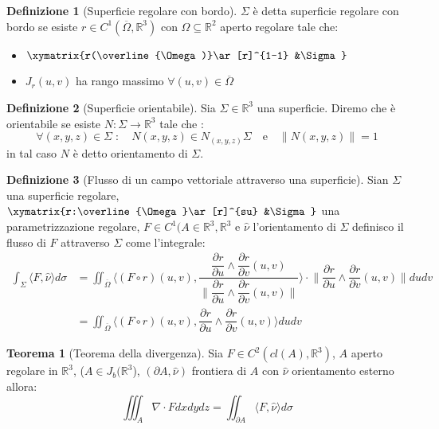 \documentclass[leqno]{article}
\theoremstyle{definition}
\newtheorem{definition}{Definizione}[section]
\numberwithin{equation}{section}
\newtheorem{theorem}{Teorema}[section]
\theoremstyle{remark}
\begin{document}
		\begin{definition}[Superficie regolare con bordo]
			$\Sigma$ è detta superficie regolare con bordo se esiste $r\in C^1(\overline{\Omega}, \mathbb{R}^3)$ con $\Omega \subseteq \mathbb{R}^2$ aperto regolare tale che:
			\begin{itemize}
				\item $\xymatrix{r(\overline{\Omega)}\ar[r]^{1-1} &\Sigma}$
				\item $J_r(u,v)$ ha rango massimo $\forall (u,v)\in \overline{\Omega}$
			\end{itemize}
		\end{definition}
		
		\begin{definition}[Superficie orientabile]
			Sia $\Sigma \in \mathbb{R}^3 $ una superficie. Diremo che è   orientabile se esiste $N:\Sigma \to \mathbb{R}^3$ tale che :
			\begin{equation}
				\forall(x,y,z)\in \Sigma \; : \quad N(x,y,z)\in N_{(x,y,z)}\Sigma \quad \text{e} \quad \lVert N(x,y,z) \rVert = 1
			\end{equation}
			in tal caso $N$ è detto orientamento di $\Sigma$.
		\end{definition}
		
		\begin{definition}[Flusso di un campo vettoriale attraverso una superficie]
			Sian $\Sigma$ una superficie regolare, $\xymatrix{r:\overline{\Omega}\ar[r]^{su} &\Sigma}$ una parametrizzazione regolare, $F\in C^1(A\in \mathbb{R}^3, \mathbb{R}^3$ e $\hat{\nu}$ l'orientamento di $\Sigma$ definisco il flusso di $F$ attraverso $\Sigma$ come l'integrale: 
			\begin{equation}
				\begin{aligned}
					\int_{\Sigma} \langle F, \hat{\nu}\rangle d \sigma &= \iint_{\overline{\Omega}}\langle \left(F \circ r\right) (u,v),\dfrac{ \dfrac{\partial r}{\partial u}\wedge \dfrac {\partial r}{\partial v} (u,v) }{\lVert \dfrac{\partial r}{\partial u}\wedge \dfrac{\partial r}{\partial v} (u,v) \rVert}\rangle \cdot  \lVert \dfrac{\partial r}{\partial u}\wedge \dfrac{\partial r}{\partial v} (u,v) \rVert dudv \\ &=\iint_{\overline{\Omega}}\langle \left(F \circ r\right) (u,v), \dfrac{\partial r}{\partial u}\wedge \dfrac {\partial r}{\partial v} (u,v) \rangle dudv
				\end{aligned}
			\end{equation}
			\end {definition}
			
			\begin{theorem}[Teorema della divergenza]
				Sia $F\in C^2(cl(A), \mathbb{R}^3)$, $A$ aperto regolare in $\mathbb{R}^3$, ($A\in J_b(\mathbb{R}^3$), $(\partial A, \hat{\nu})$ frontiera di $A$ con $\hat{\nu}$ orientamento esterno allora:
				\begin{equation}
					\iiint_A \nabla \cdot F dxdydz=\iint_{\partial A} \langle F, \hat{\nu} \rangle d\sigma
				\end{equation}
			\end{theorem}
			
			
		
\end{document}
